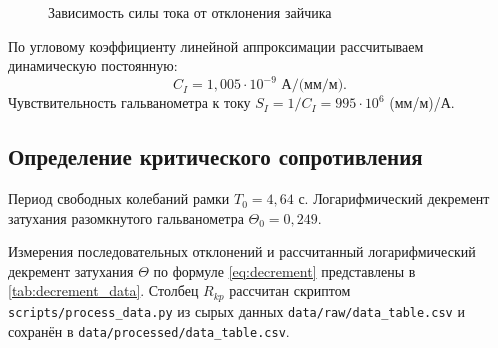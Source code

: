 \documentclass[a4paper,12pt]{article}
\begin{document}
\begin{figure}[!ht]
    \centering
    \caption{Зависимость силы тока от отклонения зайчика}
    \label{fig:ix_graph}
\end{figure}

По угловому коэффициенту линейной аппроксимации рассчитываем динамическую постоянную:
\begin{equation}
    C_I = 1,005\cdot10^{-9} \text{ А/(мм/м)}.
\end{equation}
Чувствительность гальванометра к току $S_I = 1/C_I = 995\cdot10^6$ (мм/м)/А.

\subsection{Определение критического сопротивления}

Период свободных колебаний рамки $T_0 = 4,64$ с.
Логарифмический декремент затухания разомкнутого гальванометра $\Theta_0 = 0,249$.

Измерения последовательных отклонений и рассчитанный логарифмический декремент затухания $\Theta$ по формуле \cref{eq:decrement} представлены в \cref{tab:decrement_data}. Столбец $R_{kp}$ рассчитан скриптом \texttt{scripts/process\_data.py} из сырых данных \texttt{data/raw/data\_table.csv} и сохранён в \texttt{data/processed/data\_table.csv}.
\end{document}
